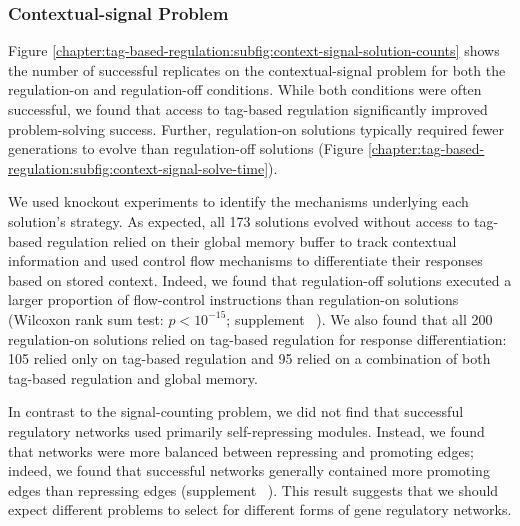 \subsubsection{Contextual-signal Problem}
\label{chapter:tag-based-regulation:sec:results:context-signal-problem}



Figure \ref{chapter:tag-based-regulation:subfig:context-signal-solution-counts} shows the number of successful replicates on the contextual-signal problem for both the regulation-on and regulation-off conditions.
While both conditions were often successful, we found that access to tag-based regulation significantly improved problem-solving success.
Further, regulation-on solutions typically required fewer generations to evolve than regulation-off solutions (Figure \ref{chapter:tag-based-regulation:subfig:context-signal-solve-time}).

We used knockout experiments to identify the mechanisms underlying each solution's strategy.
As expected, all 173 solutions evolved without access to tag-based regulation relied on their global memory buffer to track contextual information and used control flow mechanisms to differentiate their responses based on stored context.
Indeed, we found that regulation-off solutions executed a larger proportion of flow-control instructions than regulation-on solutions (Wilcoxon rank sum test: $p < 10^{-15}$; supplement \supSecContextSigAnalysis\ \citep{tag_regulation_supplement_2021}).
We also found that all 200 regulation-on solutions relied on tag-based regulation for response differentiation: 105 relied only on tag-based regulation and 95 relied on a combination of both tag-based regulation and global memory.

In contrast to the signal-counting problem, we did not find that successful regulatory networks used primarily self-repressing modules.
Instead, we found that networks were more balanced between repressing and promoting edges; indeed, we found that successful networks generally contained more promoting edges than repressing edges (supplement \supSecContextSigAnalysis\ \citep{tag_regulation_supplement_2021}).
This result suggests that we should expect different problems to select for different forms of gene regulatory networks.

